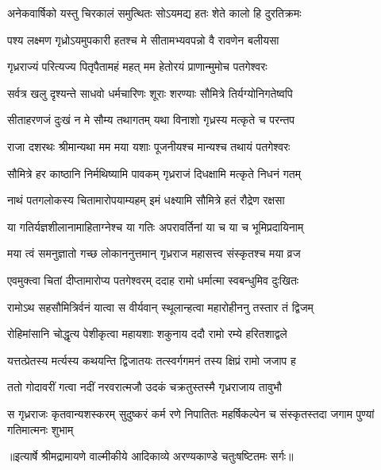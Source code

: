 \twolineshloka
{अनेकवार्षिको यस्तु चिरकालं समुत्थितः}
{सोऽयमद्य हतः शेते कालो हि दुरतिक्रमः} %

\twolineshloka
{पश्य लक्ष्मण गृध्रोऽयमुपकारी हतश्च मे}
{सीतामभ्यवपन्नो वै रावणेन बलीयसा} %

\twolineshloka
{गृध्रराज्यं परित्यज्य पितृपैतामहं महत्}
{मम हेतोरयं प्राणान्मुमोच पतगेश्वरः} %

\twolineshloka
{सर्वत्र खलु दृश्यन्ते साधवो धर्मचारिणः}
{शूराः शरण्याः सौमित्रे तिर्यग्योनिगतेष्वपि} %

\twolineshloka
{सीताहरणजं दुःखं न मे सौम्य तथागतम्}
{यथा विनाशो गृध्रस्य मत्कृते च परन्तप} %

\twolineshloka
{राजा दशरथः श्रीमान्यथा मम मया यशाः}
{पूजनीयश्च मान्यश्च तथायं पतगेश्वरः} %

\twolineshloka
{सौमित्रे हर काष्ठानि निर्मथिष्यामि पावकम्}
{गृध्रराजं दिधक्षामि मत्कृते निधनं गतम्} %

\twolineshloka
{नाथं पतगलोकस्य चितामारोपयाम्यहम्}
{इमं धक्ष्यामि सौमित्रे हतं रौद्रेण रक्षसा} %

\twolineshloka
{या गतिर्यज्ञशीलानामाहिताग्नेश्च या गतिः}
{अपरावर्तिनां या च या च भूमिप्रदायिनाम्} %

\twolineshloka
{मया त्वं समनुज्ञातो गच्छ लोकाननुत्तमान्}
{गृध्रराज महासत्त्व संस्कृतश्च मया व्रज} %

\twolineshloka
{एवमुक्त्वा चितां दीप्तामारोप्य पतगेश्वरम्}
{ददाह रामो धर्मात्मा स्वबन्धुमिव दुःखितः} %

\twolineshloka
{रामोऽथ सहसौमित्रिर्वनं यात्वा स वीर्यवान्}
{स्थूलान्हत्वा महारोहीननु तस्तार तं द्विजम्} %

\twolineshloka
{रोहिमांसानि चोद्धृत्य पेशीकृत्वा महायशाः}
{शकुनाय ददौ रामो रम्ये हरितशाद्वले} %

\twolineshloka
{यत्तत्प्रेतस्य मर्त्यस्य कथयन्ति द्विजातयः}
{तत्स्वर्गगमनं तस्य क्षिप्रं रामो जजाप ह} %

\twolineshloka
{ततो गोदावरीं गत्वा नदीं नरवरात्मजौ}
{उदकं चक्रतुस्तस्मै गृध्रराजाय तावुभौ} %

\fourlineindentedshloka
{स गृध्रराजः कृतवान्यशस्करम्}
{सुदुष्करं कर्म रणे निपातितः}
{महर्षिकल्पेन च संस्कृतस्तदा}
{जगाम पुण्यां गतिमात्मनः शुभाम्} %


{॥इत्यार्षे श्रीमद्रामायणे वाल्मीकीये आदिकाव्ये अरण्यकाण्डे चतुःषष्टितमः सर्गः॥}


